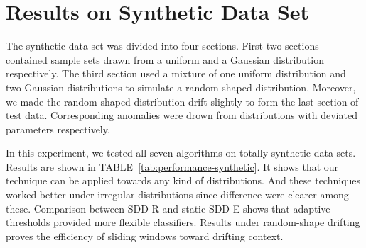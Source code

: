 \documentclass[10pt,conference,letterpaper]{article}
\begin{document}
	
	\section{Results on Synthetic Data Set}
		The synthetic data set was divided into four sections. First two sections contained sample sets drawn from a uniform and a Gaussian distribution respectively. The third section used a mixture of one uniform distribution and two Gaussian distributions to simulate a random-shaped distribution. Moreover, we made the random-shaped distribution drift slightly to form the last section of test data. Corresponding anomalies were drown from distributions with deviated parameters respectively.
		
		In this experiment, we tested all seven algorithms on totally synthetic data sets. Results are shown in TABLE~\ref{tab:performance-synthetic}. It shows that our technique can be applied towards any kind of distributions. And these techniques worked better under irregular distributions since difference were clearer among these. Comparison between SDD-R and static SDD-E 
		shows that adaptive thresholds provided more flexible classifiers. Results under random-shape drifting proves the efficiency of sliding windows toward drifting context.
		
\end{document}
